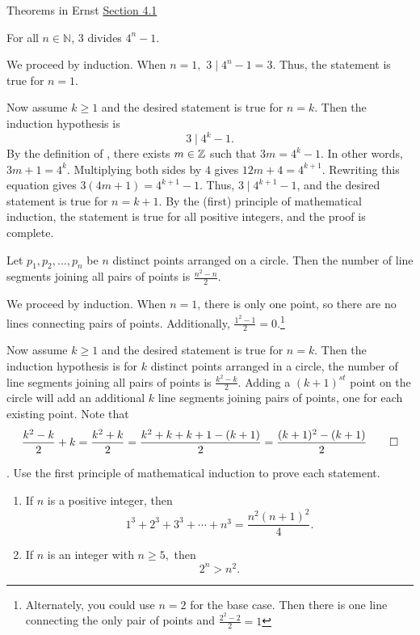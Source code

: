 \documentclass{ximera}
\begin{document}
\begin{br}
Theorems in Ernst \href{https://danaernst.com/IBL-IntroToProof/pretext/sec_Intro_to_Induction.html}{Section 4.1} 
 

\begin{thm*}
For all $n\in\mathbb{N}$, 3 divides $4^{n}-1$.
\end{thm*}
\begin{solution}
We proceed by induction.  When $n=1,$ $3\mid 4^n-1=3$. Thus, the statement is true for $n=1.$

Now assume $k\geq 1$ and the desired statement is true for $n=k$. Then the induction hypothesis is \[3\mid 4^k-1.\]
By the definition of , there exists $m\in\mathbb Z$ such that $3m=4^k-1.$ In other words, $3m+1=4^k$. Multiplying both sides by $4$ gives $12m+4=4^{k+1}$. Rewriting this equation gives $3(4m+1)=4^{k+1}-1$. Thus, $3\mid 4^{k+1}-1$, and the desired statement is true for $n=k+1$. By the (first) principle of mathematical induction, the statement is true for all positive integers, and the proof is complete.
\end{solution}

 \begin{thm*}
 Let $p_{1}, p_{2}, \ldots, p_{n}$ be $n$ distinct points arranged on a circle.  Then the number of line segments joining all pairs of points is $\frac{n^{2}-n}{2}$.
 \end{thm*}
\begin{solution}
 We proceed by induction. When $n=1$, there is only one point, so there are no lines connecting pairs of points. Additionally, $\frac{1^2-1}{2}=0$.\footnote{Alternately, you could use $n=2$ for the base case. Then there is one line connecting the only pair of points and $\frac{2^2-2}{2}=1$}
 
 Now assume $k\geq 1$ and the desired statement is true for $n=k$. Then the induction hypothesis is for $k$ distinct points arranged in a circle, the number of line segments joining all pairs of points is $\frac{k^{2}-k}{2}$. Adding a $(k+1)^{st}$ point on the circle will add an additional $k$ line segments joining pairs of points, one for each existing point. Note that 
 \[ 
 	\frac{k^{2}-k}{2}+k=\frac{k^{2}+k}{2}=
	\frac{k^2+k+k+1-(k+1)}{2}=\frac{(k+1)^{2}-(k+1)}{2}\qedhere
 \]
\end{solution}
\end{br}

\begin{br}
. Use the first principle of mathematical induction to prove each statement.
  \begin{enumerate}
    \item If $n$ is a positive integer, then 
  \[1^3+2^3+3^3+\cdots+n^3=\frac{n^2(n+1)^2}{4}.\]
  
    \item If $n$ is an integer with $n\geq 5,$ then \[2^n>n^2.\]
 
  \end{enumerate}
\end{br}







\end{document}
